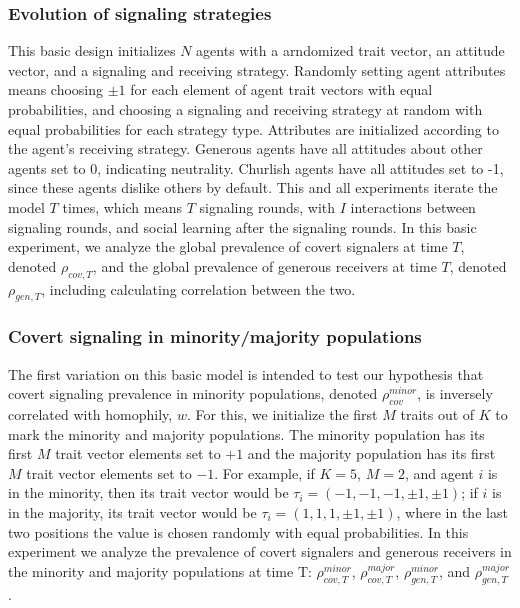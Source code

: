 \documentclass[11pt,letterpaper]{article}
\begin{document}
\subsubsection{Evolution of signaling strategies}

This basic design initializes $N$ agents with a arndomized trait vector, 
an attitude vector, and a signaling and receiving strategy.
Randomly setting agent attributes means
choosing $\pm 1$ for each element of agent trait vectors with equal 
probabilities, and choosing a signaling and receiving strategy at random
with equal probabilities for each strategy type. Attributes are initialized
according to the agent's receiving strategy. Generous agents have all 
attitudes about other agents set to 0, indicating neutrality. Churlish agents
have all attitudes set to -1, since these agents dislike others by default.
This and all experiments iterate the model $T$ times, which
means $T$ signaling rounds, with $I$ interactions between signaling rounds,
and social learning after the signaling rounds. In this basic experiment,
we analyze the global prevalence of covert signalers at time $T$, denoted
$\rho_{cov,T}$, and the global prevalence of generous receivers at time $T$,
denoted $\rho_{gen,T}$, including calculating correlation between the two.

\subsubsection{Covert signaling in minority/majority populations}
The first variation on this basic model is intended to test our 
hypothesis that covert signaling prevalence in 
minority populations, denoted $\rho_{cov}^{minor}$, is inversely correlated with
homophily, $w$. For this, we initialize the first $M$ traits out of $K$ to mark the 
minority and majority populations. The minority population has its first
$M$ trait vector elements set to $+1$ and the majority population has its
first $M$ trait vector elements set to $-1$. For example, if $K=5$, $M=2$,
and agent $i$ is in the minority, then its trait vector would be
$\tau_i = (-1, -1, -1, \pm 1, \pm 1)$; if $i$ is in the majority, its 
trait vector would be $\tau_i = (1, 1, 1, \pm 1, \pm 1)$, where in the last
two positions the value is chosen randomly with equal probabilities.
In this experiment we analyze the prevalence of covert signalers and 
generous receivers in the minority and majority populations at time T: 
$\rho_{cov,T}^{minor}$, $\rho_{cov,T}^{major}$,
$\rho_{gen,T}^{minor}$, and $\rho_{gen,T}^{major}$.
\end{document}
